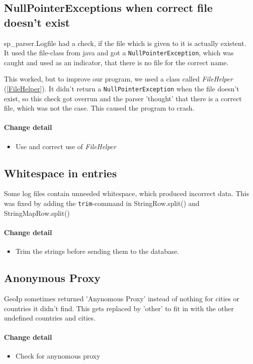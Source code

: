 \subsection{NullPointerExceptions when correct file doesn't exist}
sp\_parser.Logfile had a check, if the file which is given to it is actually existent. It used the file-class from java
and got a \texttt{NullPointerException}, which was caught and used as an indicator, that there is no file for the correct name.

This worked, but to improve our program, we used a class called \textit{FileHelper} (\ref{FileHelper}). 
It didn't return a \texttt{NullPointerException} when the file doesn't exist, 
so this check got overrun and the parser 'thought' that there is a correct file, which was not the case.
This caused the program to crash. 

\paragraph{Change detail}
\begin{itemize}
  \item Use and correct use of \textit{FileHelper}
\end{itemize}

\subsection{Whitespace in entries}
Some log files contain unneeded whitespace, which produced incorrect data. 
This was fixed by adding the \texttt{trim}-command in StringRow.split() and StringMapRow.split()

\paragraph{Change detail}
\begin{itemize}
  \item Trim the strings before sending them to the database.
\end{itemize}

\subsection{Anonymous Proxy}
GeoIp sometimes returned 'Anynomous Proxy' instead of nothing for cities or countries it didn't find.
This gets replaced by 'other' to fit in with the other undefined countries and cities.


\paragraph{Change detail}
\begin{itemize}
  \item Check for anynomous proxy
\end{itemize}

